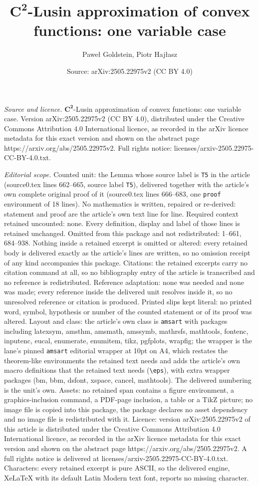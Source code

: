 \documentclass[10pt,a4paper]{amsart}
\title[$\mathbf{C^2}$-Lusin approximation of convex functions: one ]{$\mathbf{C^2}$-Lusin approximation of convex functions: one variable case}
\author{Pawe{\l} Goldstein, Piotr Haj{\l}asz}
\date{Source: arXiv:2505.22975v2 (CC BY 4.0)}
\begin{document}
\maketitle

\noindent\emph{Source and licence.} $\mathbf{C^2}$-Lusin approximation of convex functions: one variable case. Version arXiv:2505.22975v2 (CC BY 4.0), distributed under the Creative Commons Attribution 4.0 International licence, as recorded in the arXiv licence metadata for this exact version and shown on the abstract page https://arxiv.org/abs/2505.22975v2. Full rights notice: licenses/arxiv-2505.22975-CC-BY-4.0.txt.\par\smallskip

\noindent\textit{Editorial scope.} Counted unit: the Lemma whose source label is \texttt{T5} in the article (source0.tex lines 662--665, source label \texttt{T5}), delivered together with the article's own complete original proof of it (source0.tex lines 666--683, one \texttt{proof} environment of 18 lines). No mathematics is written, repaired or re-derived: statement and proof are the article's own text line for line. Required context retained uncounted: none. Every definition, display and label of those lines is retained unchanged. Omitted from this package and not redistributed: 1--661, 684--938. Nothing inside a retained excerpt is omitted or altered: every retained body is delivered exactly as the article's lines are written, so no omission receipt of any kind accompanies this package. Citations: the retained excerpts carry no citation command at all, so no bibliography entry of the article is transcribed and no reference is redistributed. Reference adaptation: none was needed and none was made; every reference inside the delivered unit resolves inside it, so no unresolved reference or citation is produced. Printed slips kept literal: no printed word, symbol, hypothesis or number of the counted statement or of its proof was altered. Layout and class: the article's own class is \texttt{amsart} with packages including latexsym, amsthm, amsmath, amssymb, mathrsfs, mathtools, fontenc, inputenc, eucal, enumerate, enumitem, tikz, pgfplots, wrapfig; the wrapper is the lane's pinned \texttt{amsart} editorial wrapper at 10pt on A4, which restates the theorem-like environments the retained text needs and adds the article's own macro definitions that the retained text needs (\texttt{\textbackslash eps}), with extra wrapper packages (bm, bbm, dsfont, xspace, cancel, mathtools). The delivered numbering is the unit's own. Assets: no retained span contains a figure environment, a graphics-inclusion command, a PDF-page inclusion, a table or a TikZ picture; no image file is copied into this package, the package declares no asset dependency and no image file is redistributed with it. Licence: version arXiv:2505.22975v2 of this article is distributed under the Creative Commons Attribution 4.0 International licence, as recorded in the arXiv licence metadata for this exact version and shown on the abstract page https://arxiv.org/abs/2505.22975v2. A full rights notice is delivered at licenses/arxiv-2505.22975-CC-BY-4.0.txt. Characters: every retained excerpt is pure ASCII, so the delivered engine, XeLaTeX with its default Latin Modern text font, reports no missing character.
\end{document}
